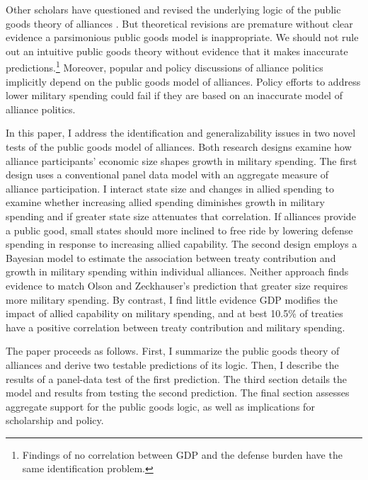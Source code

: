 \documentclass[12pt]{article}
\begin{document}
Other scholars have questioned and revised the underlying logic of the public goods theory of alliances \citep{Palmer1990, SandlerHartley2001}.  
But theoretical revisions are premature without clear evidence a parsimonious public goods model is inappropriate. 
We should not rule out an intuitive public goods theory without evidence that it makes inaccurate predictions.\footnote{
Findings of no correlation between GDP and the defense burden have the same identification problem.} 
Moreover, popular and policy discussions of alliance politics implicitly depend on the public goods model of alliances. 
Policy efforts to address lower military spending could fail if they are based on an inaccurate model of alliance politics. 


In this paper, I address the identification and generalizability issues in two novel tests of the public goods model of alliances.  
Both research designs examine how alliance participants' economic size shapes growth in military spending. 
The first design uses a conventional panel data model with an aggregate measure of alliance participation. 
I interact state size and changes in allied spending to examine whether increasing allied spending diminishes growth in military spending and if greater state size attenuates that correlation. 
If alliances provide a public good, small states should more inclined to free ride by lowering defense spending in response to increasing allied capability. 
The second design employs a Bayesian model to estimate the association between treaty contribution and growth in military spending within individual alliances. 
Neither approach finds evidence to match Olson and Zeckhauser's prediction that greater size requires more military spending. 
By contrast, I find little evidence GDP modifies the impact of allied capability on military spending, and at best 10.5\% of treaties have a positive correlation between treaty contribution and military spending. 


The paper proceeds as follows.
First, I summarize the public goods theory of alliances and derive two testable predictions of its logic.
Then, I describe the results of a panel-data test of the first prediction.
The third section details the model and results from testing the second prediction. 
The final section assesses aggregate support for the public goods logic, as well as implications for scholarship and policy. 
\end{document}
